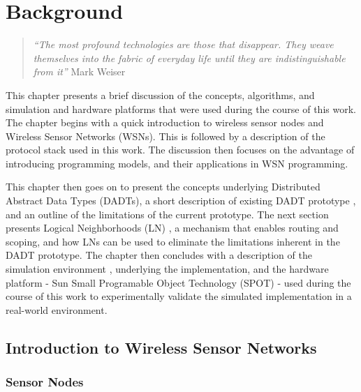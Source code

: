 \chapter{Background}

\begin{quote}
\emph{``The most profound technologies are those that disappear. They weave
themselves into the fabric of everyday life until they are indistinguishable
from it''} 
Mark Weiser \cite{Weiser_ComputerIn21stCentury}
\end{quote}


This chapter presents a brief discussion of the concepts, algorithms, and 
simulation and hardware platforms that were used
during the course of this work. The chapter begins with a quick introduction to 
wireless sensor nodes and Wireless Sensor Networks (WSNs). This is followed by a
description of the protocol stack used in this work. The discussion
then focuses on the advantage of introducing programming models, and their
applications in WSN programming.

This chapter then goes on to present the concepts underlying
Distributed Abstract Data Types (DADTs), a short 
description of existing DADT prototype \cite{migliavacca_DADT:2006}, and  an
outline
of the limitations of the current prototype. The next section presents 
Logical Neighborhoods (LN) \cite{mottola_LNScoping:2006}, a mechanism that
enables routing and scoping, and how LNs can be used to eliminate the
limitations inherent in the DADT prototype. The chapter then concludes 
with a description of the simulation environment \cite{barr_JIST:2005}, \cite{barr_SWANS} underlying the 
implementation, and the hardware platform - Sun Small Programable Object
Technology (SPOT) \cite{SunSPOTs}- used during the course of this work to experimentally validate the simulated implementation in a
real-world environment. 

\section{Introduction to Wireless Sensor Networks}

\subsection{Sensor Nodes}

